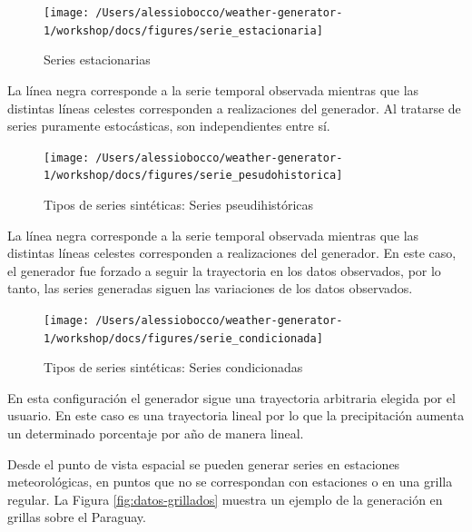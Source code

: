 \documentclass[
  12pt]{article}
\begin{document}
\begin{figure}[H]

{\centering \texttt{[image: /Users/alessiobocco/weather-generator-1/workshop/docs/figures/serie\_estacionaria]} 

}

\caption{Series estacionarias}\label{fig:serie-estacionaria}
\end{figure}

La línea negra corresponde a la serie temporal observada mientras que las distintas líneas celestes corresponden a realizaciones del generador. Al tratarse de series puramente estocásticas, son independientes entre sí.

\begin{figure}[H]

{\centering \texttt{[image: /Users/alessiobocco/weather-generator-1/workshop/docs/figures/serie\_pesudohistorica]} 

}

\caption{ Tipos de series sintéticas: Series pseudihistóricas}\label{fig:serie-pseudohistorica}
\end{figure}

La línea negra corresponde a la serie temporal observada mientras que las distintas líneas celestes corresponden a realizaciones del generador. En este caso, el generador fue forzado a seguir la trayectoria en los datos observados, por lo tanto, las series generadas siguen las variaciones de los datos observados.

\begin{figure}[H]

{\centering \texttt{[image: /Users/alessiobocco/weather-generator-1/workshop/docs/figures/serie\_condicionada]} 

}

\caption{ Tipos de series sintéticas: Series condicionadas}\label{fig:serie-condicionada}
\end{figure}

En esta configuración el generador sigue una trayectoria arbitraria elegida por el usuario. En este caso es una trayectoria lineal por lo que la precipitación aumenta un determinado porcentaje por año de manera lineal.

Desde el punto de vista espacial se pueden generar series en estaciones meteorológicas, en puntos que no se correspondan con estaciones o en una grilla regular. La Figura \ref{fig:datos-grillados} muestra un ejemplo de la generación en grillas sobre el Paraguay.
\end{document}
